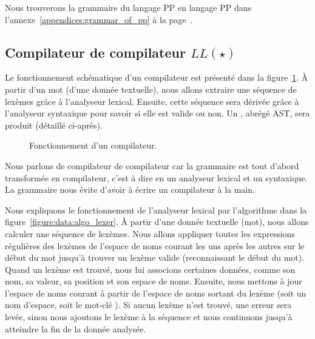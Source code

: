 Nous trouverons la grammaire du langage PP en langage PP dans
l'annexe~\ref{appendices:grammar_of_pp} à la
page~\pageref{appendices:grammar_of_pp}.

\subsection{Compilateur de compilateur $LL(\star)$}
\label{subsection:data:compiler-compiler}

Le fonctionnement schématique d'un compilateur est présenté dans la
figure~\ref{figure:data:compiler}. À partir d'un {\strong mot} (d'une donnée
textuelle), nous allons extraire une {\strong séquence} de lexèmes grâce à
l'analyseur {\strong lexical}. Ensuite, cette séquence sera {\strong dérivée}
grâce à l'analyseur {\strong syntaxique} pour savoir si elle est valide ou non.
Un , abrégé AST, sera produit (détaillé
ci-après).
%
\begin{figure}


\caption{\label{figure:data:compiler} Fonctionnement d'un compilateur.}

\end{figure}
%
Nous parlons de {\strong compilateur de compilateur} car la grammaire est tout
d'abord transformée en compilateur, c'est à dire en un analyseur lexical et un
syntaxique. La grammaire nous évite d'avoir à écrire un compilateur à la main.

Nous expliquons le fonctionnement de l'analyseur lexical par l'algorithme dans
la figure~\ref{figure:data:algo_lexer}. À partir d'une donnée textuelle (mot),
nous allons calculer une séquence de lexèmes. Nous allons appliquer toutes les
expressions régulières des lexèmes de l'espace de noms courant les uns après les
autres sur le début du mot jusqu'à trouver un lexème valide (reconnaissant le
début du mot). Quand un lexème est trouvé, nous lui associons certaines données,
comme son nom, sa valeur, sa position et son espace de noms. Ensuite, nous
mettons à jour l'espace de noms courant à partir de l'espace de noms sortant du
lexème (soit un nom d'espace, soit le mot-clé ). Si
aucun lexème n'est trouvé, une erreur sera levée, sinon nous ajoutons le lexème
à la séquence et nous continuons jusqu'à atteindre la fin de la donnée analysée.

